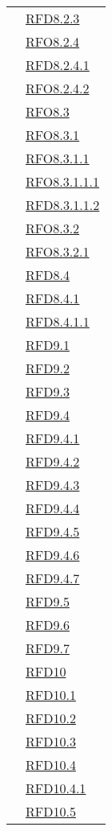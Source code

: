 \begin{longtable}{|>{\centering}m{5cm}|m{5cm}<{\centering}|}
& \hyperlink{RFD8.2.3}{RFD8.2.3}\\
& \hyperlink{RFO8.2.4}{RFO8.2.4}\\
& \hyperlink{RFD8.2.4.1}{RFD8.2.4.1}\\
& \hyperlink{RFO8.2.4.2}{RFO8.2.4.2}\\
& \hyperlink{RFO8.3}{RFO8.3}\\
& \hyperlink{RFO8.3.1}{RFO8.3.1}\\
& \hyperlink{RFO8.3.1.1}{RFO8.3.1.1}\\
& \hyperlink{RFO8.3.1.1.1}{RFO8.3.1.1.1}\\
& \hyperlink{RFD8.3.1.1.2}{RFD8.3.1.1.2}\\
& \hyperlink{RFO8.3.2}{RFO8.3.2}\\
& \hyperlink{RFO8.3.2.1}{RFO8.3.2.1}\\
& \hyperlink{RFD8.4}{RFD8.4}\\
& \hyperlink{RFD8.4.1}{RFD8.4.1}\\
& \hyperlink{RFD8.4.1.1}{RFD8.4.1.1}\\
& \hyperlink{RFD9.1}{RFD9.1}\\
& \hyperlink{RFD9.2}{RFD9.2}\\
& \hyperlink{RFD9.3}{RFD9.3}\\
& \hyperlink{RFD9.4}{RFD9.4}\\
& \hyperlink{RFD9.4.1}{RFD9.4.1}\\
& \hyperlink{RFD9.4.2}{RFD9.4.2}\\
& \hyperlink{RFD9.4.3}{RFD9.4.3}\\
& \hyperlink{RFD9.4.4}{RFD9.4.4}\\
& \hyperlink{RFD9.4.5}{RFD9.4.5}\\
& \hyperlink{RFD9.4.6}{RFD9.4.6}\\
& \hyperlink{RFD9.4.7}{RFD9.4.7}\\
& \hyperlink{RFD9.5}{RFD9.5}\\
& \hyperlink{RFD9.6}{RFD9.6}\\
& \hyperlink{RFD9.7}{RFD9.7}\\
& \hyperlink{RFD10}{RFD10}\\
& \hyperlink{RFD10.1}{RFD10.1}\\
& \hyperlink{RFD10.2}{RFD10.2}\\
& \hyperlink{RFD10.3}{RFD10.3}\\
& \hyperlink{RFD10.4}{RFD10.4}\\
& \hyperlink{RFD10.4.1}{RFD10.4.1}\\
& \hyperlink{RFD10.5}{RFD10.5}\\

\end{longtable}

